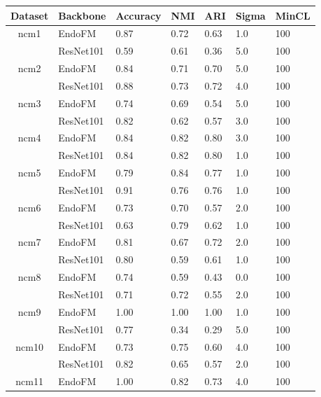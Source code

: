 \begin{table}[h]
\small
\setlength\tabcolsep{3pt}
    \centering
    \vspace{-0.05in}
    \begin{tabular}{cllllll}
    \toprule
        Dataset & Backbone & Accuracy & NMI & ARI & Sigma & MinCL \\
        \midrule
    \multirow{2}{*}{ncm1}
 & EndoFM & 0.87 & 0.72 & 0.63 & 1.0 & 100 \\
     & ResNet101 & 0.59 & 0.61 & 0.36 & 5.0 & 100 \\
    \midrule
    \multirow{2}{*}{ncm2}
 & EndoFM & 0.84 & 0.71 & 0.70 & 5.0 & 100 \\
     & ResNet101 & 0.88 & 0.73 & 0.72 & 4.0 & 100 \\
    \midrule
    \multirow{2}{*}{ncm3}
 & EndoFM & 0.74 & 0.69 & 0.54 & 5.0 & 100 \\
     & ResNet101 & 0.82 & 0.62 & 0.57 & 3.0 & 100 \\
    \midrule
    \multirow{2}{*}{ncm4}
 & EndoFM & 0.84 & 0.82 & 0.80 & 3.0 & 100 \\
     & ResNet101 & 0.84 & 0.82 & 0.80 & 1.0 & 100 \\
    \midrule
    \multirow{2}{*}{ncm5}
 & EndoFM & 0.79 & 0.84 & 0.77 & 1.0 & 100 \\
     & ResNet101 & 0.91 & 0.76 & 0.76 & 1.0 & 100 \\
    \midrule
    \multirow{2}{*}{ncm6}
 & EndoFM & 0.73 & 0.70 & 0.57 & 2.0 & 100 \\
     & ResNet101 & 0.63 & 0.79 & 0.62 & 1.0 & 100 \\
    \midrule
    \multirow{2}{*}{ncm7}
 & EndoFM & 0.81 & 0.67 & 0.72 & 2.0 & 100 \\
     & ResNet101 & 0.80 & 0.59 & 0.61 & 1.0 & 100 \\
    \midrule
    \multirow{2}{*}{ncm8}
 & EndoFM & 0.74 & 0.59 & 0.43 & 0.0 & 100 \\
     & ResNet101 & 0.71 & 0.72 & 0.55 & 2.0 & 100 \\
    \midrule
    \multirow{2}{*}{ncm9}
 & EndoFM & 1.00 & 1.00 & 1.00 & 1.0 & 100 \\
     & ResNet101 & 0.77 & 0.34 & 0.29 & 5.0 & 100 \\
    \midrule
    \multirow{2}{*}{ncm10}
 & EndoFM & 0.73 & 0.75 & 0.60 & 4.0 & 100 \\
     & ResNet101 & 0.82 & 0.65 & 0.57 & 2.0 & 100 \\
    \midrule
    \multirow{2}{*}{ncm11}
 & EndoFM & 1.00 & 0.82 & 0.73 & 4.0 & 100 \\

\end{tabular}
\end{table}
